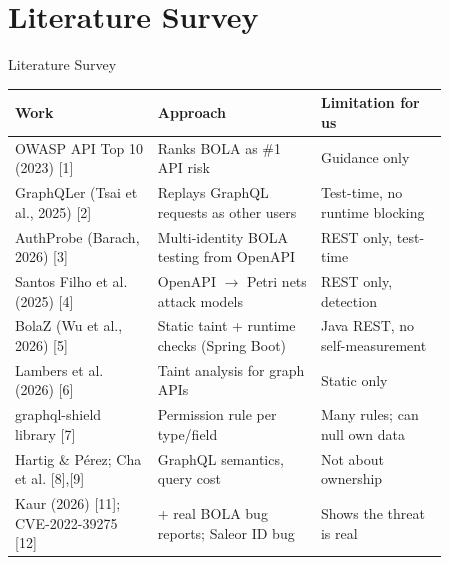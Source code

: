 \documentclass[aspectratio=169,11pt]{beamer}
\begin{document}
\section{Literature Survey}
\begin{frame}{Literature Survey}
\begin{center}
\footnotesize
\renewcommand{\arraystretch}{1.05}
\begin{tabular}{>{\raggedright\arraybackslash}p{0.287\linewidth}>{\raggedright\arraybackslash}p{0.323\linewidth}>{\raggedright\arraybackslash}p{0.251\linewidth}}
\toprule
\textbf{Work} & \textbf{Approach} & \textbf{Limitation for us} \\
\midrule
OWASP API Top 10 (2023) [1] & Ranks BOLA as \#1 API risk & Guidance only \\
\rowcolor{rowgrey}GraphQLer (Tsai et al., 2025) [2] & Replays GraphQL requests as other users & Test-time, no runtime blocking \\
AuthProbe (Barach, 2026) [3] & Multi-identity BOLA testing from OpenAPI & REST only, test-time \\
\rowcolor{rowgrey}Santos Filho et al. (2025) [4] & OpenAPI $\rightarrow$ Petri nets attack models & REST only, detection \\
BolaZ (Wu et al., 2026) [5] & Static taint + runtime checks (Spring Boot) & Java REST, no self-measurement \\
\rowcolor{rowgrey}Lambers et al. (2026) [6] & Taint analysis for graph APIs & Static only \\
graphql-shield library [7] & Permission rule per type/field & Many rules; can null own data \\
\rowcolor{rowgrey}Hartig \& Pérez; Cha et al. [8],[9] & GraphQL semantics, query cost & Not about ownership \\
Kaur (2026) [11]; CVE-2022-39275 [12] & 100+ real BOLA bug reports; Saleor ID bug & Shows the threat is real \\
\bottomrule
\end{tabular}
\end{center}
\end{frame}
\end{document}
